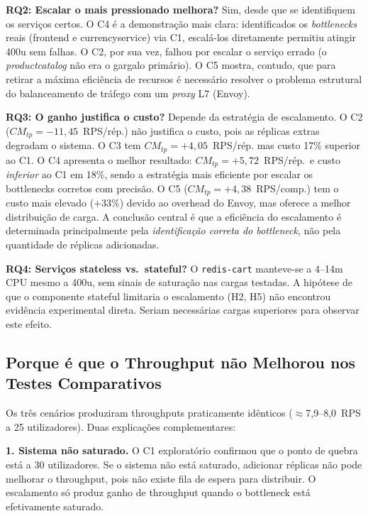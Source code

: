 \documentclass[manuscript,oneside]{acmart}
\begin{document}
\textbf{RQ2: Escalar o mais pressionado melhora?} Sim, desde que se identifiquem os serviços certos. O C4 é a demonstração mais clara: identificados os \textit{bottlenecks} reais (frontend e currencyservice) via C1, escalá-los diretamente permitiu atingir 400u sem falhas. O C2, por sua vez, falhou por escalar o serviço errado (o \textit{productcatalog} não era o gargalo primário). O C5 mostra, contudo, que para retirar a máxima eficiência de recursos é necessário resolver o problema estrutural do balanceamento de tráfego com um \textit{proxy} L7 (Envoy).

\textbf{RQ3: O ganho justifica o custo?} Depende da estratégia de escalamento. O C2 ($CM_{tp}=-11{,}45$~RPS/rép.) não justifica o custo, pois as réplicas extras degradam o sistema. O C3 tem $CM_{tp}=+4{,}05$~RPS/rép. mas custo 17\% superior ao C1. O C4 apresenta o melhor resultado: $CM_{tp}=+5{,}72$~RPS/rép.\ e custo \emph{inferior} ao C1 em 18\%, sendo a estratégia mais eficiente por escalar os bottlenecks corretos com precisão. O C5 ($CM_{tp}=+4{,}38$~RPS/comp.) tem o custo mais elevado (+33\%) devido ao overhead do Envoy, mas oferece a melhor distribuição de carga. A conclusão central é que a eficiência do escalamento é determinada principalmente pela \emph{identificação correta do bottleneck}, não pela quantidade de réplicas adicionadas.

\textbf{RQ4: Serviços stateless vs.\ stateful?} O \texttt{redis-cart} manteve-se a 4--14m CPU mesmo a 400u, sem sinais de saturação nas cargas testadas. A hipótese de que o componente stateful limitaria o escalamento (H2, H5) não encontrou evidência experimental direta. Seriam necessárias cargas superiores para observar este efeito.

\subsection{Porque é que o Throughput não Melhorou nos Testes Comparativos}

Os três cenários produziram throughputs praticamente idênticos ($\approx$7{,}9--8{,}0~RPS a 25 utilizadores). Duas explicações complementares:

\textbf{1. Sistema não saturado.} O C1 exploratório confirmou que o ponto de quebra está a 30 utilizadores. Se o sistema não está saturado, adicionar réplicas não pode melhorar o throughput, pois não existe fila de espera para distribuir. O escalamento só produz ganho de throughput quando o bottleneck está efetivamente saturado.
\end{document}
